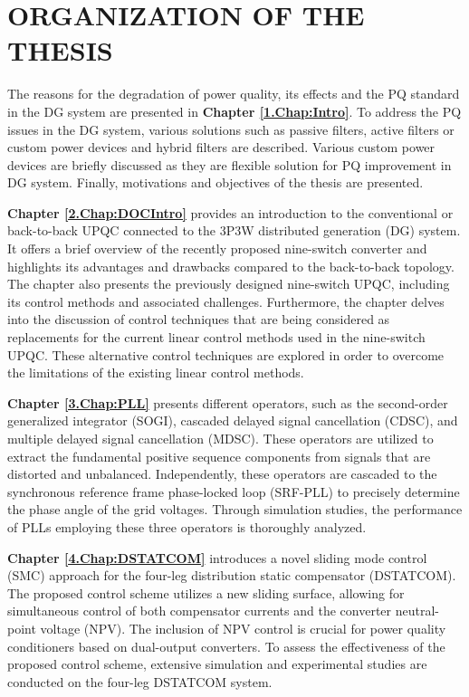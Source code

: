 \section{ORGANIZATION OF  THE THESIS}

The reasons for the degradation of power quality, its effects and the PQ standard in the DG system are presented in \textbf{Chapter \ref{1.Chap:Intro}}. To address the PQ issues in the DG system, various solutions such as passive filters, active filters or custom power devices and hybrid filters are described. Various custom power devices are briefly discussed as they are flexible solution for PQ improvement in DG system. Finally, motivations and objectives of the thesis are presented.


\textbf{Chapter \ref{2.Chap:DOCIntro}} provides an introduction to the conventional or back-to-back UPQC connected to the 3P3W distributed generation (DG) system. It offers a brief overview of the recently proposed nine-switch converter and highlights its advantages and drawbacks compared to the back-to-back topology. The chapter also presents the previously designed nine-switch UPQC, including its control methods and associated challenges. Furthermore, the chapter delves into the discussion of control techniques that are being considered as replacements for the current linear control methods used in the nine-switch UPQC. These alternative control techniques are explored in order to overcome the limitations of the existing linear control methods.

\textbf{Chapter \ref{3.Chap:PLL}} presents different operators, such as the second-order generalized integrator (SOGI), cascaded delayed signal cancellation (CDSC), and multiple delayed signal cancellation (MDSC). These operators are utilized to extract the fundamental positive sequence components from signals that are distorted and unbalanced. Independently, these operators are cascaded to the synchronous reference frame phase-locked loop (SRF-PLL) to precisely determine the phase angle of the grid voltages. Through simulation studies, the performance of PLLs employing these three operators is thoroughly analyzed. 


\textbf{Chapter \ref{4.Chap:DSTATCOM}} introduces a novel sliding mode control (SMC) approach for the four-leg distribution static compensator (DSTATCOM). The proposed control scheme utilizes a new sliding surface, allowing for simultaneous control of both compensator currents and the converter neutral-point voltage (NPV). The inclusion of NPV control is crucial for power quality conditioners based on dual-output converters. To assess the effectiveness of the proposed control scheme, extensive simulation and experimental studies are conducted on the four-leg DSTATCOM system.

